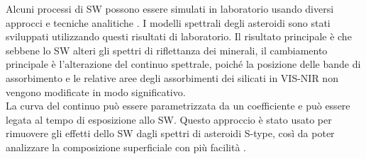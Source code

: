 \documentclass[a4paper,11pt,openright]{book}
\begin{document}
Alcuni processi di SW possono essere simulati in laboratorio usando diversi approcci e tecniche analitiche \citep{bennett_space-weathering_2013}. I modelli spettrali degli asteroidi sono stati sviluppati utilizzando questi risultati di laboratorio. Il risultato principale è che sebbene lo SW alteri gli spettri di riflettanza dei minerali, il cambiamento principale è l'alterazione del continuo spettrale, poiché la posizione delle bande di assorbimento e le relative aree degli assorbimenti dei silicati in VIS-NIR non vengono modificate in modo significativo.\\
La curva del continuo può essere parametrizzata da un coefficiente e può essere legata al tempo di esposizione allo SW. Questo approccio è stato usato per rimuovere gli effetti dello SW dagli spettri di asteroidi S-type, così da poter analizzare la composizione superficiale con più facilità \citep{BRUNETTO2006327, popescu_modelling_2012}.


\end{document}
